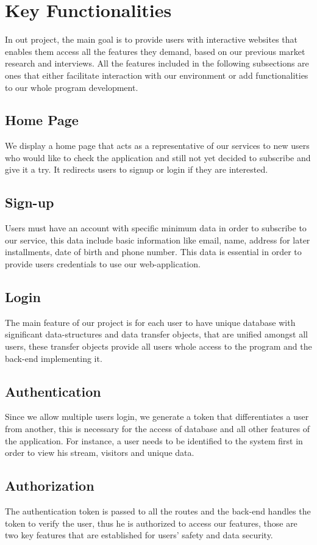 \documentclass[a4 paper, 12pt]{article}
\begin{document}
\section{Key Functionalities}
In out project, the main goal is to provide users with interactive websites that enables them access all the features they demand, based on our previous market research and interviews. All the features included in the following subsections are ones that either facilitate interaction with our environment or add functionalities to our whole program development.
\subsection{Home Page}
We display a home page that acts as a representative of our services to new users who would like to check the application and still not yet decided to subscribe and give it a try. It redirects users to signup or login if they are interested.
\subsection{Sign-up}
Users must have an account with specific minimum data in order to subscribe to our service, this data include basic information like email, name, address for later installments, date of birth and phone number. This data is essential in order to provide users credentials to use our web-application.
\subsection{Login}
The main feature of our project is for each user to have unique database with significant data-structures and data transfer objects, that are unified amongst all users, these transfer objects provide all users whole access to the program and the back-end implementing it.
\subsection{Authentication}
Since we allow multiple users login, we generate a token that differentiates a user from another, this is necessary for the access of database and all other features of the application. For instance, a user needs to be identified to the system first in order to view his stream, visitors and unique data.
\subsection{Authorization}
The authentication token is passed to all the routes and the back-end handles the token to verify the user, thus he is authorized to access our features, those are two key features that are established for users' safety and data security.
\end{document}

